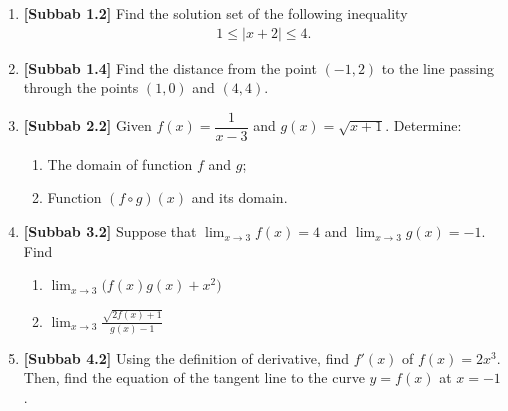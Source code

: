 \documentclass[10pt,openany,a4paper]{article}
\theoremstyle{definition}
\theoremstyle{definition}
\theoremstyle{plain}
\begin{document}
\begin{enumerate}
    \item \textbf{[Subbab 1.2]} Find the solution set of the following inequality
    \begin{align*}
        1\leq|x+2|\leq 4.
    \end{align*}

    \item \textbf{[Subbab 1.4]} Find the distance from the point $(-1,2)$ to the line passing through the points $(1,0)$ and $(4,4)$.

    \item \textbf{[Subbab 2.2]} Given $f(x)=\dfrac{1}{x-3}$ and $g(x)=\sqrt{x+1}$. Determine:
    \begin{enumerate}
        \item[a)] The domain of function $f$ and $g$;
        \item[b)] Function $(f\circ g)(x)$ and its domain.
    \end{enumerate}

    \item \textbf{[Subbab 3.2]} Suppose that $\displaystyle\lim_{x\to 3}f(x)=4$ and $\displaystyle\lim_{x\to 3}g(x)=-1$. Find
    \begin{enumerate}
        \item[a.] $\displaystyle\lim_{x\to 3}\big(f(x)g(x)+x^2\big)$
        \item[b.] $\displaystyle\lim_{x\to 3}\frac{\sqrt{2f(x)+1}}{g(x)-1}$
    \end{enumerate}

    \item \textbf{[Subbab 4.2]} Using the definition of derivative, find $f'(x)$ of $f(x)=2x^3$. Then, find the equation of the tangent line to the curve $y=f(x)$ at $x=-1$.
\end{enumerate}

\newpage
\end{document}
